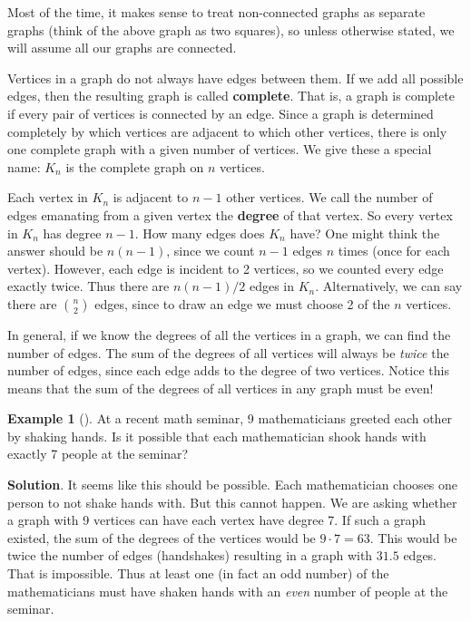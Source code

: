 \documentclass[10pt,]{book}
\newcommand{\terminology}[1]{\textbf{#1}}
\theoremstyle{plain}
\theoremstyle{definition}
\theoremstyle{definition}
\newtheorem{example}[theorem]{Example}
\theoremstyle{definition}
\theoremstyle{definition}
\numberwithin{equation}{chapter}
\begin{document}
\par
\hypertarget{p-68}{}%
Most of the time, it makes sense to treat non-connected graphs as separate graphs (think of the above graph as two squares), so unless otherwise stated, we will assume all our graphs are connected.%
\par
\hypertarget{p-69}{}%
Vertices in a graph do not always have edges between them. If we add all possible edges, then the resulting graph is called \terminology{complete}. That is, a graph is complete if every pair of vertices is connected by an edge. Since a graph is determined completely by which vertices are adjacent to which other vertices, there is only one complete graph with a given number of vertices. We give these a special name: \(K_n\)\label{notation-1}
 is the complete graph on \(n\) vertices.%
\par
\hypertarget{p-70}{}%
Each vertex in \(K_n\) is adjacent to \(n-1\) other vertices. We call the number of edges emanating from a given vertex the \terminology{degree} of that vertex. So every vertex in \(K_n\) has degree \(n-1\). How many edges does \(K_n\) have? One might think the answer should be \(n(n-1)\), since we count \(n-1\) edges \(n\) times (once for each vertex). However, each edge is incident to 2 vertices, so we counted every edge exactly twice. Thus there are \(n(n-1)/2\) edges in \(K_n\). Alternatively, we can say there are \({n \choose 2}\) edges, since to draw an edge we must choose 2 of the \(n\) vertices.%
\par
\hypertarget{p-71}{}%
In general, if we know the degrees of all the vertices in a graph, we can find the number of edges. The sum of the degrees of all vertices will always be \emph{twice} the number of edges, since each edge adds to the degree of two vertices. Notice this means that the sum of the degrees of all vertices in any graph must be even!%
\begin{example}[]\label{example-5}
\hypertarget{p-72}{}%
At a recent math seminar, 9 mathematicians greeted each other by shaking hands. Is it possible that each mathematician shook hands with exactly 7 people at the seminar?%
\par\smallskip%
\noindent\textbf{Solution}.\hypertarget{solution-4}{}\quad%
\hypertarget{p-73}{}%
It seems like this should be possible. Each mathematician chooses one person to not shake hands with. But this cannot happen. We are asking whether a graph with 9 vertices can have each vertex have degree 7. If such a graph existed, the sum of the degrees of the vertices would be \(9\cdot 7 = 63\). This would be twice the number of edges (handshakes) resulting in a graph with \(31.5\) edges. That is impossible. Thus at least one (in fact an odd number) of the mathematicians must have shaken hands with an \emph{even} number of people at the seminar.%
\end{example}
\end{document}
